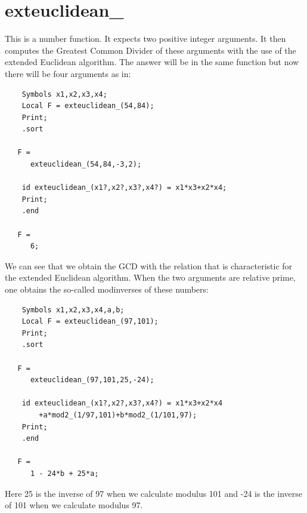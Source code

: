 
\section{exteuclidean\_}
\label{funexteuclidean}

\noindent This is a number function. It expects two positive integer 
arguments. It then computes the Greatest Common Divider of these arguments 
with the use of the extended Euclidean algorithm. The answer will be in the 
same function but now there will be four arguments as in:
\begin{verbatim}
    Symbols x1,x2,x3,x4;
    Local F = exteuclidean_(54,84);
    Print;
    .sort

   F =
      exteuclidean_(54,84,-3,2);

    id exteuclidean_(x1?,x2?,x3?,x4?) = x1*x3+x2*x4;
    Print;
    .end

   F =
      6;
\end{verbatim}
\noindent We can see that we obtain the GCD with the relation that is 
characteristic for the extended Euclidean algorithm. When the two arguments 
are relative prime, one obtains the so-called modinverses of these numbers:
\begin{verbatim}
    Symbols x1,x2,x3,x4,a,b;
    Local F = exteuclidean_(97,101);
    Print;
    .sort

   F =
      exteuclidean_(97,101,25,-24);

    id exteuclidean_(x1?,x2?,x3?,x4?) = x1*x3+x2*x4
        +a*mod2_(1/97,101)+b*mod2_(1/101,97);
    Print;
    .end

   F =
      1 - 24*b + 25*a;
\end{verbatim}
\noindent Here 25 is the inverse of 97 when we calculate modulus 101 and 
-24 is the inverse of 101 when we calculate modulus 97.

